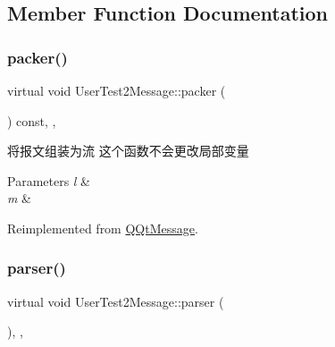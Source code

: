 \subsection{Member Function Documentation}
\mbox{\label{class_user_test2_message_a7dedda7f8f5f49ca24fac391ba4d02d2}} 
\subsubsection{\texorpdfstring{packer()}{packer()}}
{\footnotesize\ttfamily virtual void User\+Test2\+Message\+::packer (\begin{DoxyParamCaption}\item[{Q\+Byte\+Array \&}]{ }\end{DoxyParamCaption}) const\hspace{0.3cm}{\ttfamily [inline]}, {\ttfamily [override]}, {\ttfamily [virtual]}}



将报文组装为流 这个函数不会更改局部变量 


\begin{DoxyParams}{Parameters}
{\em l} & \\
\hline
{\em m} & \\
\hline
\end{DoxyParams}


Reimplemented from \mbox{\hyperlink{class_q_qt_message_af1885c2c3628495808dca66ee8d72e14}{Q\+Qt\+Message}}.

\mbox{\label{class_user_test2_message_ad7a4a9e020c0ede85bee7d5e9d2c91ba}} 
\subsubsection{\texorpdfstring{parser()}{parser()}}
{\footnotesize\ttfamily virtual void User\+Test2\+Message\+::parser (\begin{DoxyParamCaption}\item[{const Q\+Byte\+Array \&}]{ }\end{DoxyParamCaption})\hspace{0.3cm}{\ttfamily [inline]}, {\ttfamily [override]}, {\ttfamily [virtual]}}



